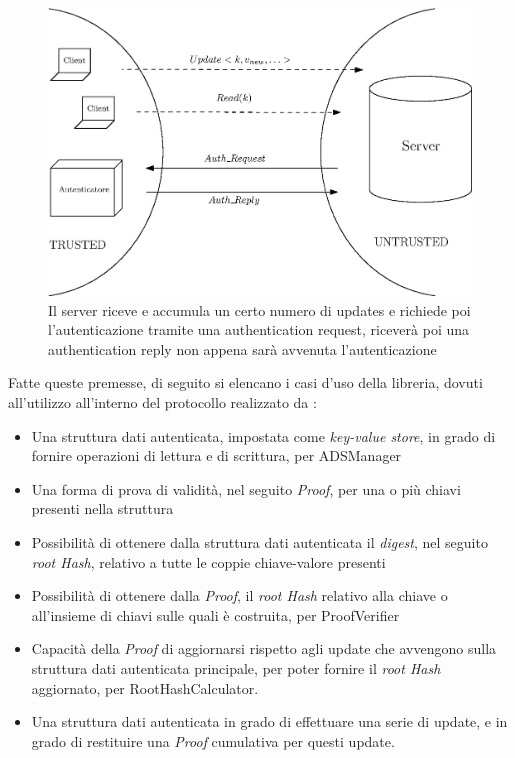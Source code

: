 	\begin{figure}
		\centering
		\includegraphics[scale=0.6]{figure/semicircles.eps}
		\caption{Il server riceve e accumula un certo numero di updates e richiede poi l'autenticazione tramite una authentication request, riceverà poi una authentication reply non appena sarà avvenuta l'autenticazione}\label{fig:semicircles}
	\end{figure}
	
	Fatte queste premesse, di seguito si elencano i casi d'uso della libreria, dovuti all'utilizzo all'interno del protocollo realizzato da \cite{pipelineintegrity_thesis}:
	
	\begin{itemize}
		\item Una struttura dati autenticata, impostata come \textit{key-value store}, in grado di fornire operazioni di lettura e di scrittura, per ADSManager
		\item Una forma di prova di validità, nel seguito \textit{Proof}, per una o più chiavi presenti nella struttura
		\item Possibilità di ottenere dalla struttura dati autenticata il \textit{digest}, nel seguito \textit{root Hash}, relativo a tutte le coppie chiave-valore presenti
		\item Possibilità di ottenere dalla \textit{Proof}, il \textit{root Hash} relativo alla chiave o all'insieme di chiavi sulle quali è costruita, per ProofVerifier
		\item Capacità della \textit{Proof} di aggiornarsi rispetto agli update che avvengono sulla struttura dati autenticata principale, per poter fornire il \textit{root Hash} aggiornato, per RootHashCalculator.
 		\item Una struttura dati autenticata in grado di effettuare una serie di update, e in grado di restituire una \textit{Proof} cumulativa per questi update.
	\end{itemize}
	
